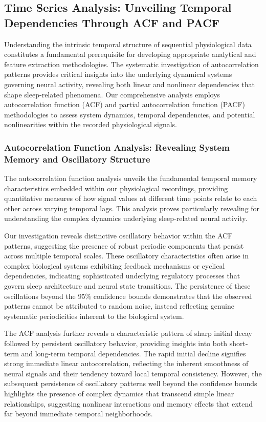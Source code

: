\documentclass[a4paper,12pt,twoside]{article}
\begin{document}
\subsection{Time Series Analysis: Unveiling Temporal Dependencies Through ACF and PACF}  

Understanding the intrinsic temporal structure of sequential physiological data constitutes a fundamental prerequisite for developing appropriate analytical and feature extraction methodologies. The systematic investigation of autocorrelation patterns provides critical insights into the underlying dynamical systems governing neural activity, revealing both linear and nonlinear dependencies that shape sleep-related phenomena. Our comprehensive analysis employs autocorrelation function (ACF) and partial autocorrelation function (PACF) methodologies to assess system dynamics, temporal dependencies, and potential nonlinearities within the recorded physiological signals.

\subsubsection{Autocorrelation Function Analysis: Revealing System Memory and Oscillatory Structure}

The autocorrelation function analysis unveils the fundamental temporal memory characteristics embedded within our physiological recordings, providing quantitative measures of how signal values at different time points relate to each other across varying temporal lags. This analysis proves particularly revealing for understanding the complex dynamics underlying sleep-related neural activity.

Our investigation reveals distinctive oscillatory behavior within the ACF patterns, suggesting the presence of robust periodic components that persist across multiple temporal scales. These oscillatory characteristics often arise in complex biological systems exhibiting feedback mechanisms or cyclical dependencies, indicating sophisticated underlying regulatory processes that govern sleep architecture and neural state transitions. The persistence of these oscillations beyond the 95\% confidence bounds demonstrates that the observed patterns cannot be attributed to random noise, instead reflecting genuine systematic periodicities inherent to the biological system.

The ACF analysis further reveals a characteristic pattern of sharp initial decay followed by persistent oscillatory behavior, providing insights into both short-term and long-term temporal dependencies. The rapid initial decline signifies strong immediate linear autocorrelation, reflecting the inherent smoothness of neural signals and their tendency toward local temporal consistency. However, the subsequent persistence of oscillatory patterns well beyond the confidence bounds highlights the presence of complex dynamics that transcend simple linear relationships, suggesting nonlinear interactions and memory effects that extend far beyond immediate temporal neighborhoods.
\end{document}
